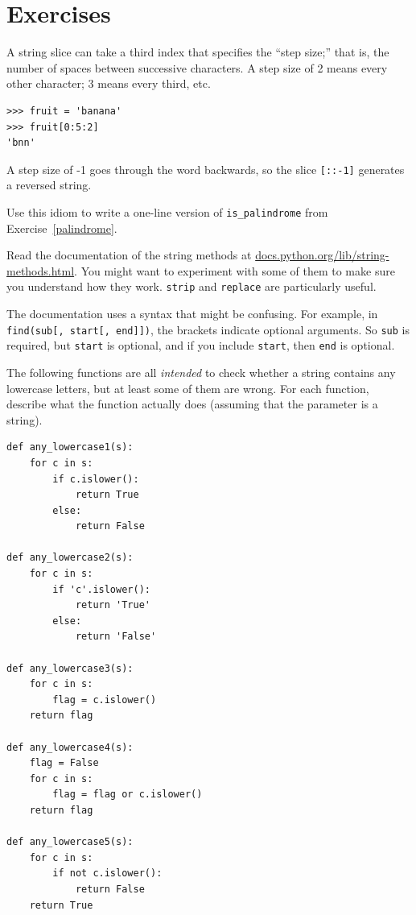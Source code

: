 \documentclass[10pt]{book}
\begin{document}
\section{Exercises}

\begin{ex}


A string slice can take a third index that specifies the ``step
size;'' that is, the number of spaces between successive characters.
A step size of 2 means every other character; 3 means every third,
etc.

\beforeverb
\begin{verbatim}
>>> fruit = 'banana'
>>> fruit[0:5:2]
'bnn'
\end{verbatim}
\afterverb

A step size of -1 goes through the word backwards, so
the slice \verb"[::-1]" generates a reversed string.


Use this idiom to write a one-line version of \verb"is_palindrome"
from Exercise~\ref{palindrome}.
\end{ex}


\begin{ex}

Read the documentation of the string methods at
\url{docs.python.org/lib/string-methods.html}.  You
might want to experiment with some of them to make sure
you understand how they work.  {\tt strip} and
{\tt replace} are particularly useful.

The documentation uses a syntax that might be confusing.
For example, in \verb"find(sub[, start[, end]])", the brackets
indicate optional arguments.  So {\tt sub} is required, but
{\tt start} is optional, and if you include {\tt start},
then {\tt end} is optional.
\end{ex}

\begin{ex}
The following functions are all {\em intended} to check whether a
string contains any lowercase letters, but at least some of them are
wrong.  For each function, describe what the function actually does
(assuming that the parameter is a string).

\beforeverb
\begin{verbatim}
def any_lowercase1(s):
    for c in s:
        if c.islower():
            return True
        else:
            return False

def any_lowercase2(s):
    for c in s:
        if 'c'.islower():
            return 'True'
        else:
            return 'False'

def any_lowercase3(s):
    for c in s:
        flag = c.islower()
    return flag

def any_lowercase4(s):
    flag = False
    for c in s:
        flag = flag or c.islower()
    return flag

def any_lowercase5(s):
    for c in s:
        if not c.islower():
            return False
    return True
\end{verbatim}
\afterverb

\end{ex}
\end{document}
